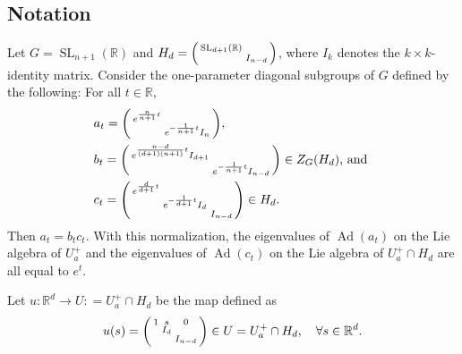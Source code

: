 \documentclass[12pt,reqno]{amsart}
\newcommand{\SL}{\operatorname{SL}}
\newcommand{\defeq}{\mathrel{\mathop:}=}
\numberwithin{equation}{section}
\theoremstyle{plain}
\theoremstyle{definition}
\theoremstyle{remark}
\newcommand\bbR{\mathbb{R}}
\newcommand{\R}{\mathbb{R}}
\DeclareMathOperator{\Ad}{Ad}
\begin{document}
    \subsection{Notation} \label{subsec:notation}
	Let $G=\SL_{n+1}(\bbR)$ and 
    $H_d=\begin{psmallmatrix}
	\SL_{d+1}(\bbR) & \\
	& I_{n-d}
	\end{psmallmatrix}$, where $I_k$ denotes the $k\times k$-identity matrix. Consider the one-parameter diagonal subgroups of $G$ defined by the following: For all $t\in\R$,
	\begin{align}
	&a_t=\begin{psmallmatrix}
	e^{\frac{n}{n+1}t} & \\
	& e^{-\frac{1}{n+1}t}I_n
	\end{psmallmatrix},\label{eq:gt}\\
	&b_t=\begin{psmallmatrix}
	e^{\frac{n-d}{(d+1)(n+1)}t}I_{d+1} & \\
	& e^{-\frac{1}{n+1}t}I_{n-d}
	\end{psmallmatrix}\in Z_G(H_d)\text{, and } \label{eq:bt}\\
	&c_t=\begin{psmallmatrix}
	e^{\frac{d}{d+1}t} & & \\
	& e^{-\frac{1}{d+1}t}I_d & \\
	& & I_{n-d}
	\end{psmallmatrix}\in H_d. \label{eq:ct}
	\end{align}
	Then $a_t=b_tc_t$. With this normalization, the eigenvalues of $\Ad(a_t)$ on the Lie algebra of $U_a^+$ and the eigenvalues of $\Ad(c_t)$ on the Lie algebra of $U_a^+\cap H_d$ are all equal to $e^t$. 

    Let $u:\R^d\to U\defeq U_a^+\cap H_d$ be the map defined as
    \begin{equation}
    \label{eq:us}
    u(s)=\begin{psmallmatrix}
        1& s &0\\
        & I_{d}\\
        && I_{n-d}
    \end{psmallmatrix}\in U=U_a^+\cap H_d, \quad \forall s\in \R^d.
    \end{equation}
\end{document}
